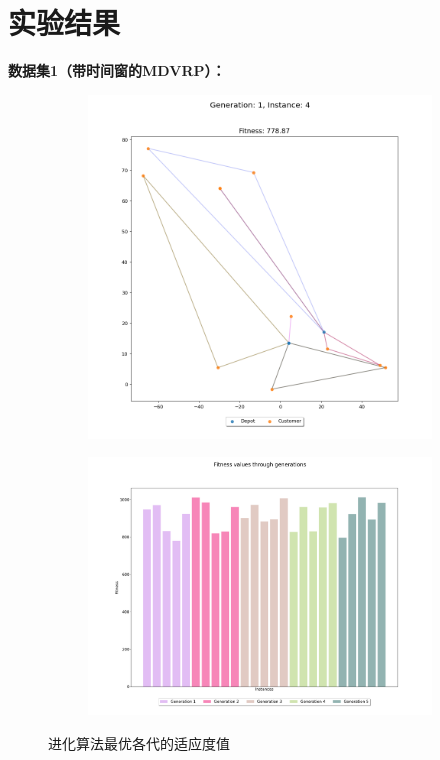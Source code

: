 \documentclass[12pt,a4paper,oneside]{ctexart}
\begin{document}
	
\section{实验结果}
\textbf{数据集1（带时间窗的MDVRP）：}

\begin{figure}[htbp]
	\centering
	\begin{subfigure}[b]{0.316\textwidth}
		\centering
		\includegraphics[width=\textwidth]{fig/5.png}
	\end{subfigure}
	\hspace{2pt} %
	\begin{subfigure}[b]{0.4\textwidth}
		\centering
		\includegraphics[width=\textwidth]{fig/6.png}
	\end{subfigure}
	\caption{进化算法最优各代的适应度值}
\end{figure}
\end{document}
